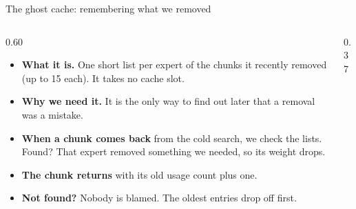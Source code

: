 \documentclass[aspectratio=169,11pt]{beamer}
\begin{document}
\begin{frame}{The ghost cache: remembering what we removed}
\begin{columns}[c,onlytextwidth]
\begin{column}{0.60\textwidth}
\small
\begin{itemize}
  \setlength{\itemsep}{4pt}
  \item \textbf{What it is.} One short list per expert of the chunks it
        recently removed (up to 15 each). It takes no cache slot.
  \item \textbf{Why we need it.} It is the only way to find out later
        that a removal was a mistake.
  \item \textbf{When a chunk comes back} from the cold search, we check
        the lists. Found? That expert removed something we needed, so
        its weight drops.
  \item \textbf{The chunk returns} with its old usage count plus one.
  \item \textbf{Not found?} Nobody is blamed. The oldest entries drop
        off first.
\end{itemize}
\end{column}
\begin{column}{0.37\textwidth}
\centering
{}
\end{column}
\end{columns}
\end{frame}
\end{document}

